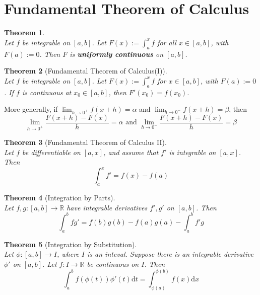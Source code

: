 \documentclass[12pt]{article}
\newcommand{\diff}{\mathrm{d}}
\newtheorem{theorem}{Theorem}[section]
\theoremstyle{definition}
\begin{document}
\section{Fundamental Theorem of Calculus}
\begin{theorem}
\hfill\\\normalfont Let $f$ be integrable on $[a,b]$. Let $F(x):=\int_a^x f$ for all $x\in[a,b]$, with $F(a):=0$. Then $F$ is \textbf{uniformly continuous} on $[a,b]$.
\end{theorem}
\begin{theorem}[Fundamental Theorem of Calculus(I)]
\hfill\\\normalfont Let $f$ be integrable on $[a,b]$. Let $F(x):=\int_a^xf$ for $x\in[a,b]$, with $F(a):=0$. If $f$ is continuous at $x_0\in[a,b]$, then $F'(x_0)=f(x_0)$.
\end{theorem}
More generally, if $\lim_{h\to 0^{+}} f(x+h)=\alpha$ and $\lim_{h\to 0^{-}} f(x+h)=\beta$, then
\[
\lim_{h\to 0^{+}} \frac{F(x+h)-F(x)}{h}=\alpha\text{  and }\lim_{h\to 0^{-}} \frac{F(x+h)-F(x)}{h}=\beta
\]
\begin{theorem}[Fundamental Theorem of Calculus II]
\hfill\\\normalfont Let $f$ be differentiable on $[a,x]$, and assume that $f'$ is integrable on $[a,x]$. Then 
\[
\int_a^x f' = f(x)-f(a)
\]
\end{theorem}
\begin{theorem}[Integration by Parts]
\hfill\\\normalfont Let $f,g:[a,b]\to\mathbb{R}$ have integrable derivatives $f', g'$ on $[a,b]$. Then
\[
\int_a^b fg' = f(b)g(b)-f(a)g(a)-\int_a^b f'g
\]
\end{theorem}
\begin{theorem}[Integration by Substitution]
\hfill\\\normalfont Let $\phi:[a,b]\to I$, where $I$ is an inteval. Suppose there is an integrable derivative $\phi'$ on $[a,b]$. Let $f:I\to\mathbb{R}$ be continuous on $I$. Then
\[
\int_a^b f(\phi(t))\phi'(t)\diff t = \int_{\phi(a)}^{\phi(b)} f(x)\diff x
\]
\end{theorem}
\clearpage
\end{document}

